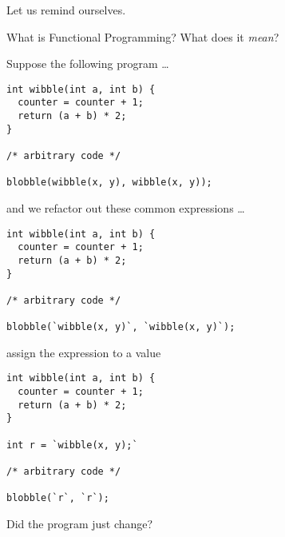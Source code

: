 \begin{frame}
\begin{center}
Let us remind ourselves.
\end{center}
\begin{center}
What is Functional Programming? What does it \emph{mean}?
\end{center}
\end{frame}

\begin{frame}[fragile]
\begin{block}{Suppose the following program \ldots}
\begin{lstlisting}[style=java]
int wibble(int a, int b) {
  counter = counter + 1;
  return (a + b) * 2;
}

/* arbitrary code */

blobble(wibble(x, y), wibble(x, y));
\end{lstlisting}
\end{block}
\end{frame}

\begin{frame}[fragile]
\begin{block}{and we refactor out these common expressions \ldots}
\begin{lstlisting}[style=java]
int wibble(int a, int b) {
  counter = counter + 1;
  return (a + b) * 2;
}

/* arbitrary code */

blobble(`wibble(x, y)`, `wibble(x, y)`);
\end{lstlisting}
\end{block}
\end{frame}

\begin{frame}[fragile]
\begin{block}{assign the expression to a value}
\begin{lstlisting}[style=java]
int wibble(int a, int b) {
  counter = counter + 1;
  return (a + b) * 2;
}

int r = `wibble(x, y);`

/* arbitrary code */

blobble(`r`, `r`);
\end{lstlisting}
\end{block}
\end{frame}

\begin{frame}[fragile]
\begin{center}
Did the program just change?
\end{center}
\end{frame}

